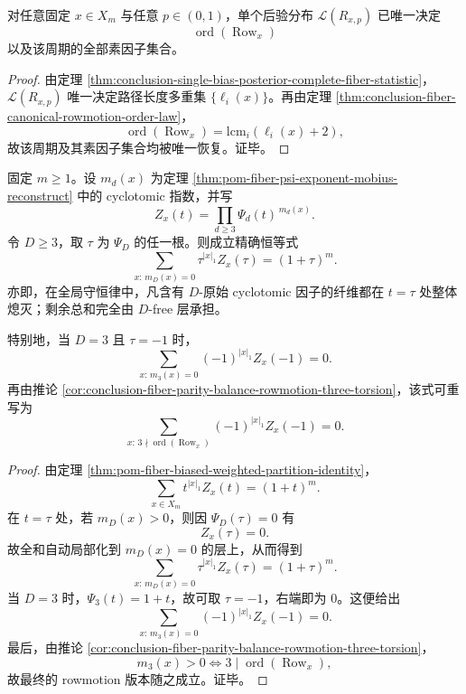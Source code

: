 \begin{corollary}\label{cor:conclusion-single-bias-posterior-determines-rowmotion-order}
对任意固定 \(x\in X_m\) 与任意 \(p\in(0,1)\)，单个后验分布 \(\mathcal L(R_{x,p})\) 已唯一决定
\[
\operatorname{ord}(\operatorname{Row}_x)
\]
以及该周期的全部素因子集合。
\end{corollary}
\begin{proof}
由定理 \ref{thm:conclusion-single-bias-posterior-complete-fiber-statistic}，\(\mathcal L(R_{x,p})\) 唯一决定路径长度多重集 \(\{\ell_i(x)\}\)。再由定理 \ref{thm:conclusion-fiber-canonical-rowmotion-order-law}，
\[
\operatorname{ord}(\operatorname{Row}_x)=\mathrm{lcm}_{i}(\ell_i(x)+2),
\]
故该周期及其素因子集合均被唯一恢复。证毕。
\end{proof}

\begin{theorem}\label{thm:conclusion-fiber-cyclotomic-primitive-divisor-global-localization}
固定 \(m\ge 1\)。设 \(m_d(x)\) 为定理 \ref{thm:pom-fiber-psi-exponent-mobius-reconstruct} 中的 cyclotomic 指数，并写
\[
Z_x(t)=\prod_{d\ge 3}\Psi_d(t)^{\,m_d(x)}.
\]
令 \(D\ge 3\)，取 \(\tau\) 为 \(\Psi_D\) 的任一根。则成立精确恒等式
\[
\sum_{x:\,m_D(x)=0}\tau^{|x|_1}Z_x(\tau)=(1+\tau)^m.
\]
亦即，在全局守恒律中，凡含有 \(D\)-原始 cyclotomic 因子的纤维都在 \(t=\tau\) 处整体熄灭；剩余总和完全由 \(D\)-free 层承担。

特别地，当 \(D=3\) 且 \(\tau=-1\) 时，
\[
\sum_{x:\,m_3(x)=0}(-1)^{|x|_1}Z_x(-1)=0.
\]
再由推论 \ref{cor:conclusion-fiber-parity-balance-rowmotion-three-torsion}，该式可重写为
\[
\sum_{x:\,3\nmid \operatorname{ord}(\operatorname{Row}_x)}(-1)^{|x|_1}Z_x(-1)=0.
\]
\end{theorem}
\begin{proof}
由定理 \ref{thm:pom-fiber-biased-weighted-partition-identity}，
\[
\sum_{x\in X_m} t^{|x|_1}Z_x(t)=(1+t)^m.
\]
在 \(t=\tau\) 处，若 \(m_D(x)>0\)，则因 \(\Psi_D(\tau)=0\) 有
\[
Z_x(\tau)=0.
\]
故全和自动局部化到 \(m_D(x)=0\) 的层上，从而得到
\[
\sum_{x:\,m_D(x)=0}\tau^{|x|_1}Z_x(\tau)=(1+\tau)^m.
\]
当 \(D=3\) 时，\(\Psi_3(t)=1+t\)，故可取 \(\tau=-1\)，右端即为 \(0\)。这便给出
\[
\sum_{x:\,m_3(x)=0}(-1)^{|x|_1}Z_x(-1)=0.
\]
最后，由推论 \ref{cor:conclusion-fiber-parity-balance-rowmotion-three-torsion}，
\[
m_3(x)>0
\iff
3\mid \operatorname{ord}(\operatorname{Row}_x),
\]
故最终的 rowmotion 版本随之成立。证毕。
\end{proof}


